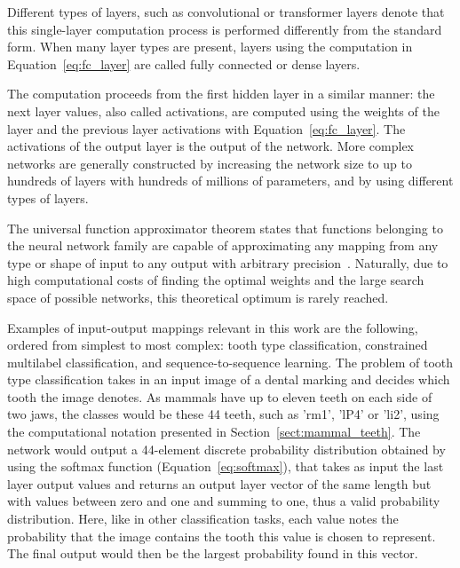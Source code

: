 \documentclass[english,twoside,openright]{UH_DS_MSc}
\begin{document}
Different types of layers, such as convolutional or transformer layers 
denote that this single-layer computation process is performed differently from 
the standard form. When many layer types are present, layers using the computation
in Equation~\ref{eq:fc_layer} are called fully connected or dense layers.

The computation proceeds from the first hidden layer in a similar manner: 
the next layer values, also called activations, are computed using the weights of 
the layer and the previous layer activations with Equation~\ref{eq:fc_layer}.
The activations of the output layer is the output of the network.
More complex networks are generally constructed by increasing the network size to up to 
hundreds of layers with hundreds of millions of parameters, and by using
different types of layers.

The universal function approximator theorem states that functions belonging to the 
neural network family are capable of approximating any mapping from any type or shape of input
to any output with arbitrary precision~\cite{princebook}. Naturally, due to high computational 
costs of finding the optimal weights and the large search space of possible networks, 
this theoretical optimum is rarely reached.

Examples of input-output mappings relevant in this work are the following, 
ordered from simplest to most complex: tooth type classification, constrained multilabel classification, 
and sequence-to-sequence learning. The problem of tooth type classification takes in an input image of a dental marking
 and decides which tooth the image denotes.
As mammals have up to eleven teeth on each side of two jaws, the classes would be 
these 44 teeth, such as 'rm1', 'lP4' or 'li2', using the computational notation presented in
Section~\ref{sect:mammal_teeth}. The network would output a 44-element discrete probability distribution 
obtained by using the softmax function (Equation~\ref{eq:softmax}), that takes as input the last layer output
values and returns an output layer vector of the same length but with values between zero and one and summing to one, 
thus a valid probability distribution.
Here, like in other classification tasks, each value notes the probability that the image contains 
the tooth this value is chosen to represent. The final output would then be the largest probability
found in this vector.
\end{document}
